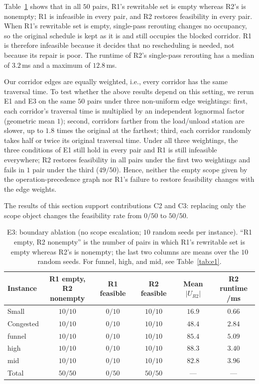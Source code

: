 \documentclass[manuscript,screen,review]{acmart}
\newcommand{\NSeeds}{10}
\newcommand{\NPairs}{50}
\newcommand{\FeasRone}{0/\NPairs}            %
\newcommand{\FeasRtwo}{\NPairs/\NPairs}      %
\newcommand{\MsRepairMed}{3.2}
\newcommand{\MsRepairMax}{12.8}
\newcommand{\WeightSplitRtwo}{49/\NPairs}
\begin{document}
Table~\ref{tab:e3} shows that in all \(\NPairs\) pairs, R1's rewritable set is empty whereas R2's is nonempty;
R1 is infeasible in every pair, and R2 restores feasibility in every pair. When R1's rewritable set is empty, single-pass rerouting changes no occupancy,
so the original schedule is kept as it is and still occupies the blocked corridor. R1 is therefore infeasible because it decides that no rescheduling is needed, not because its repair is poor.
The runtime of R2's single-pass rerouting has a median of \(\MsRepairMed\)\,ms and a maximum of \(\MsRepairMax\)\,ms.

Our corridor edges are equally weighted, i.e., every corridor has the same traversal time. To test whether the above results depend on this setting,
we rerun E1 and E3 on the same \(\NPairs\) pairs under three non-uniform edge weightings:
first, each corridor's traversal time is multiplied by an independent lognormal factor (geometric mean \(1\));
second, corridors farther from the load/unload station are slower, up to \(1.8\) times the original at the farthest;
third, each corridor randomly takes half or twice its original traversal time.
Under all three weightings, the three conditions of E1 still hold in every pair and R1 is still infeasible everywhere;
R2 restores feasibility in all pairs under the first two weightings and fails in \(1\) pair under the third (\(\WeightSplitRtwo\)).
Hence, neither the empty scope given by the operation-precedence graph nor R1's failure to restore feasibility changes with the edge weights.

The results of this section support contributions C2 and C3: replacing only the scope object changes the feasibility rate from \(\FeasRone\) to \(\FeasRtwo\).

\begin{table}[t]
\centering
\caption{E3: boundary ablation (no scope escalation; \(\NSeeds\) random seeds per instance).
``R1 empty, R2 nonempty'' is the number of pairs in which R1's rewritable set is empty whereas R2's is nonempty; the last two columns are means over the \(\NSeeds\) random seeds.
For funnel, high, and mid, see Table~\ref{tab:e1}.}
\label{tab:e3}
\small
\begin{tabular}{@{}lccccc@{}}
\toprule
Instance & \makecell{R1 empty,\\R2 nonempty} & R1 feasible & R2 feasible & Mean \(|U_{R2}|\) & \makecell{R2 runtime\\/ms} \\
\midrule
Small      & \(10/10\) & \(0/10\) & \(10/10\) & \(16.9\) & \(0.66\) \\
Congested  & \(10/10\) & \(0/10\) & \(10/10\) & \(48.4\) & \(2.84\) \\
funnel  & \(10/10\) & \(0/10\) & \(10/10\) & \(85.4\) & \(5.09\) \\
high    & \(10/10\) & \(0/10\) & \(10/10\) & \(88.3\) & \(3.40\) \\
mid     & \(10/10\) & \(0/10\) & \(10/10\) & \(82.8\) & \(3.96\) \\
\midrule
Total & \(\NPairs/\NPairs\) & \(\FeasRone\) & \(\FeasRtwo\) & --- & --- \\
\bottomrule
\end{tabular}
\end{table}
\end{document}
